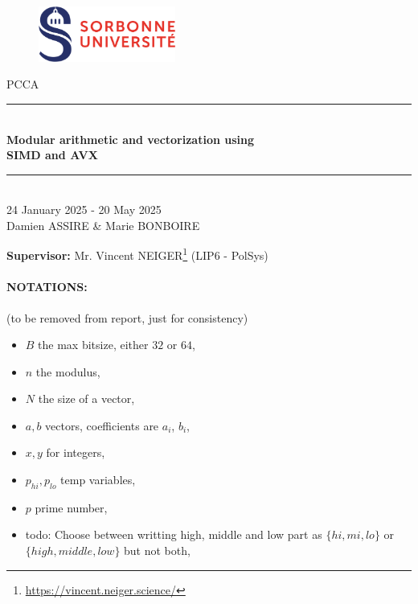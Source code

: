 \documentclass[a4paper]{article}
\begin{document}
\thispagestyle{plain}
\begin{titlepage}
    \begin{figure}[h]
        \centering
        \includegraphics[width=0.4\textwidth]{su.png}
    \end{figure}
    \vspace{1cm}

    \begin{center}
        {\LARGE PCCA}\\[0.3cm]
        \rule{\linewidth}{0.5mm} \\[0.4cm]
        {\huge \textbf{Modular arithmetic and vectorization using\\ SIMD and AVX}}\\[0.4cm]
        \rule{\linewidth}{0.5mm} \\[1cm]
        {\large 24 January 2025 - 20 May 2025}\\[3cm]

        {\Large Damien ASSIRE \& Marie BONBOIRE}


    \end{center}

    \vfill
\begin{flushleft}{\large
    \textbf{Supervisor:} Mr. Vincent NEIGER\footnote{\url{https://vincent.neiger.science/}} (LIP6 - PolSys)\\
    }
\end{flushleft}
\end{titlepage}
\newpage

\tableofcontents
\newpage

\paragraph{NOTATIONS:} (to be removed from report, just for consistency)
\begin{itemize}
    \item $B$ the max bitsize, either $32$ or $64$,
    \item $n$ the modulus,
    \item $N$ the size of a vector,
    \item $a,b$ vectors, coefficients are $a_i$, $b_i$,
    \item $x,y$ for integers,
    \item $p_{hi}, p_{lo}$ temp variables,
    \item $p$ prime number,
    \item todo: Choose between writting high, middle and low part as $\{hi,mi,lo\}$ or $\{high, middle, low\}$ but not both,
\end{itemize}
\end{document}
